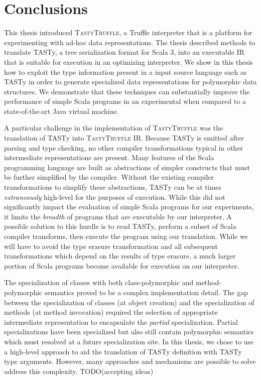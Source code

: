 \chapter{Conclusions}

This thesis introduced \textsc{TastyTruffle}, a Truffle interpreter that is a platform for experimenting with ad-hoc data representations.
The thesis described methods to translate TASTy, a tree serialization format for Scala 3, into an executable IR that is suitable for execution in an optimizing interpreter.
We show in this thesis how to exploit the type information present in a input source language such as TASTy in order to generate specialized data representations for polymorphic data structures.
We demonstrate that these techniques can substantially improve the performance of simple Scala programs in an experimental when compared to a state-of-the-art Java virtual machine.

A particular challenge in the implementation of \textsc{TastyTruffle} was the translation of TASTy into \textsc{TastyTruffle} IR.
Because TASTy is emitted after parsing and type checking, no other compiler transformations typical in other intermediate representations are present.
Many features of the Scala programming language are built as abstractions of simpler constructs that must be further simplified by the compiler.
Without the existing compiler transformations to simplify these abstractions, TASTy can be at times \textit{extraneously} high-level for the purposes of execution.
While this did not significantly impact the evaluation of simple Scala programs for our experiments, it limits the \textit{breadth} of programs that are executable by our interpreter.
A possible solution to this hurdle is to read TASTy, perform a subset of Scala compiler transforms, then execute the program using our translation.
While we will have to avoid the type erasure transformation and all subsequent transformations which depend on the results of type erasure, a much larger portion of Scala programs become available for execution on our interpreter.

The specialization of classes with both class-polymorphic and method-polymorphic semantics proved to be a complex implementation detail.
The gap between the specialization of classes (at object creation) and the specialization of methods (at method invocation) required the selection of appropriate intermediate representation to encapsulate the \textit{partial} specialization.
Partial specializations have been specialized but also still contain polymorphic semantics which must resolved at a future specialization site.
In this thesis, we chose to use a high-level approach to aid the translation of TASTy definition with TASTy type arguments.
However, many approaches and mechanisms are possible to solve address this complexity.
TODO(accepting ideas)

